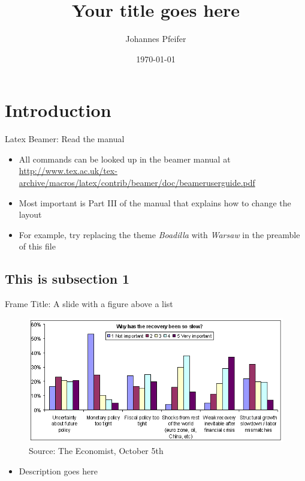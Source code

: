 \documentclass{beamer}
\title{Your title goes here}
\date{\today}
\author{Johannes Pfeifer}
\institute{University of Cologne}
\begin{document}
\begin{frame}
  \titlepage
\end{frame}


\begin{frame}
    \tableofcontents
\end{frame}

\section{Introduction}
\begin{frame}{Latex Beamer: Read the manual}
    \begin{itemize}
        \item All commands can be looked up in the beamer manual at
            \url{http://www.tex.ac.uk/tex-archive/macros/latex/contrib/beamer/doc/beameruserguide.pdf}
        \item Most important is Part III of the manual that explains how to change the layout
        \item For example, try replacing the theme \textit{Boadilla} with \textit{Warsaw} in the preamble of this file
    \end{itemize}
\end{frame}


\subsection{This is subsection 1}
\begin{frame}{Frame Title: A slide with a figure above a list}
    \begin{figure}
        \includegraphics[scale=.3]{why_has_the_recovery_been_so_slow_all_respondents_0}
        \caption{Source: The Economist, October 5th}
    \end{figure}
    \begin{itemize}
        \item Description goes here
    \end{itemize}
\end{frame}
\end{document}
